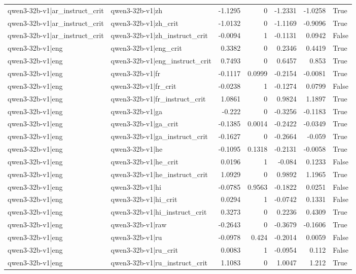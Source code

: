 \begin{table}
\begin{tabular}{l l r r r r l}
qwen3-32b-v1|ar_instruct_crit & qwen3-32b-v1|zh & -1.1295 & 0 & -1.2331 & -1.0258 & True \\
qwen3-32b-v1|ar_instruct_crit & qwen3-32b-v1|zh_crit & -1.0132 & 0 & -1.1169 & -0.9096 & True \\
qwen3-32b-v1|ar_instruct_crit & qwen3-32b-v1|zh_instruct_crit & -0.0094 & 1 & -0.1131 & 0.0942 & False \\
qwen3-32b-v1|eng & qwen3-32b-v1|eng_crit & 0.3382 & 0 & 0.2346 & 0.4419 & True \\
qwen3-32b-v1|eng & qwen3-32b-v1|eng_instruct_crit & 0.7493 & 0 & 0.6457 & 0.853 & True \\
qwen3-32b-v1|eng & qwen3-32b-v1|fr & -0.1117 & 0.0999 & -0.2154 & -0.0081 & True \\
qwen3-32b-v1|eng & qwen3-32b-v1|fr_crit & -0.0238 & 1 & -0.1274 & 0.0799 & False \\
qwen3-32b-v1|eng & qwen3-32b-v1|fr_instruct_crit & 1.0861 & 0 & 0.9824 & 1.1897 & True \\
qwen3-32b-v1|eng & qwen3-32b-v1|ga & -0.222 & 0 & -0.3256 & -0.1183 & True \\
qwen3-32b-v1|eng & qwen3-32b-v1|ga_crit & -0.1385 & 0.0014 & -0.2422 & -0.0349 & True \\
qwen3-32b-v1|eng & qwen3-32b-v1|ga_instruct_crit & -0.1627 & 0 & -0.2664 & -0.059 & True \\
qwen3-32b-v1|eng & qwen3-32b-v1|he & -0.1095 & 0.1318 & -0.2131 & -0.0058 & True \\
qwen3-32b-v1|eng & qwen3-32b-v1|he_crit & 0.0196 & 1 & -0.084 & 0.1233 & False \\
qwen3-32b-v1|eng & qwen3-32b-v1|he_instruct_crit & 1.0929 & 0 & 0.9892 & 1.1965 & True \\
qwen3-32b-v1|eng & qwen3-32b-v1|hi & -0.0785 & 0.9563 & -0.1822 & 0.0251 & False \\
qwen3-32b-v1|eng & qwen3-32b-v1|hi_crit & 0.0294 & 1 & -0.0742 & 0.1331 & False \\
qwen3-32b-v1|eng & qwen3-32b-v1|hi_instruct_crit & 0.3273 & 0 & 0.2236 & 0.4309 & True \\
qwen3-32b-v1|eng & qwen3-32b-v1|raw & -0.2643 & 0 & -0.3679 & -0.1606 & True \\
qwen3-32b-v1|eng & qwen3-32b-v1|ru & -0.0978 & 0.424 & -0.2014 & 0.0059 & False \\
qwen3-32b-v1|eng & qwen3-32b-v1|ru_crit & 0.0083 & 1 & -0.0954 & 0.112 & False \\
qwen3-32b-v1|eng & qwen3-32b-v1|ru_instruct_crit & 1.1083 & 0 & 1.0047 & 1.212 & True \\

\end{tabular}
\end{table}
